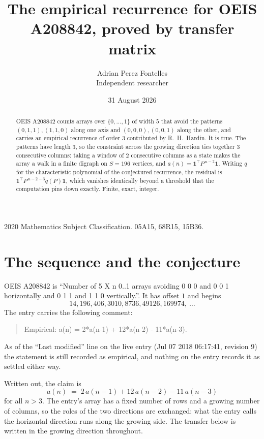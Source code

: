\documentclass[11pt,a4paper]{article}
\title{The empirical recurrence for OEIS A208842, proved by transfer matrix}
\author{Adrian Perez Fontelles\\ \small Independent researcher}
\date{31 August 2026}
\theoremstyle{plain}
\theoremstyle{definition}
\begin{document}
\maketitle

\begin{abstract}
OEIS A208842 counts arrays over $\{0,\dots,1\}$ of width $5$ that avoid the patterns
$(0,1,1), (1,1,0)$ along one axis and $(0,0,0), (0,0,1)$ along the other, and carries an empirical recurrence of
order $3$ contributed by R.~H.~Hardin. It is true. The patterns have length $3$, so
the constraint across the growing direction ties together $3$ consecutive columns: taking a
window of $2$ consecutive columns as a state makes the array a walk in a finite digraph
on $S=196$ vertices, and $a(n)=\mathbf{1}^{\!\top}P^{\,n-2}\mathbf{1}$. Writing $q$
for the characteristic polynomial of the conjectured recurrence, the residual is
$\mathbf{1}^{\!\top}P^{\,n-2-3}q(P)\mathbf{1}$, which vanishes identically
beyond a threshold that the computation pins down exactly. Finite, exact, integer.
\end{abstract}

\noindent\small 2020 Mathematics Subject Classification. 05A15, 68R15, 15B36.\normalsize

\section{The sequence and the conjecture}

OEIS A208842 is ``Number of 5 X n 0..1 arrays avoiding 0 0 0 and 0 0 1 horizontally and 0 1 1 and 1 1 0 vertically.''. It has offset
$1$ and begins
\[
14, 196, 406, 3010, 8736, 49126, 169974,\ \dots
\]
The entry carries the following comment:
\begin{quote}\small
Empirical: a(n) = 2*a(n-1) + 12*a(n-2) - 11*a(n-3).
\end{quote}
As of the ``Last modified'' line on the live entry (Jul 07 2018 06:17:41, revision
9) the statement is still recorded as empirical, and nothing on the entry
records it as settled either way.

Written out, the claim is
\begin{equation}\label{eq:conj}
a(n)\;=\;2\,a(n-1) + 12\,a(n-2) - 11\,a(n-3)
\end{equation}
for all $n>3$. The entry's array has a fixed number of rows and a growing number of
columns, so the roles of the two directions are exchanged: what the entry calls the
horizontal direction runs along the growing side. The transfer below is written in the
growing direction throughout.
\end{document}
